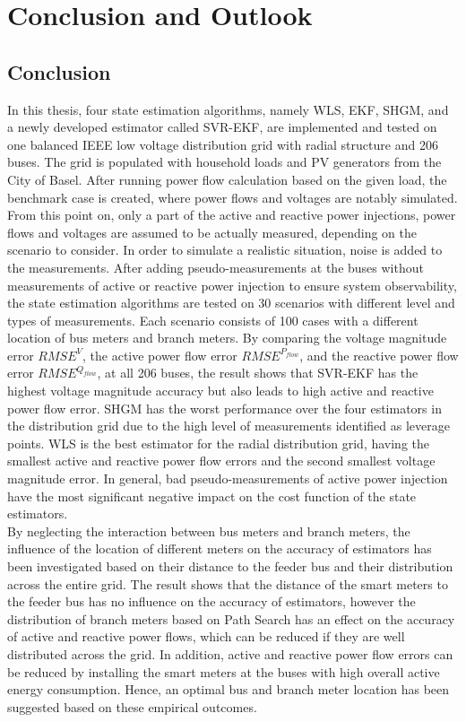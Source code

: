 \chapter{Conclusion and Outlook}

\section{Conclusion}
In this thesis, four state estimation algorithms, namely WLS, EKF, SHGM, and a newly developed estimator called SVR-EKF, are implemented and tested on one balanced IEEE low voltage distribution grid with radial structure and 206 buses. The grid is populated with household loads and PV generators from the City of Basel. After running power flow calculation based on the given load, the benchmark case is created, where power flows and voltages are notably simulated. From this point on, only a part of the active and reactive power injections, power flows and voltages are assumed to be actually measured, depending on the scenario to consider. In order to simulate a realistic situation, noise is added to the measurements. After adding pseudo-measurements at the buses without measurements of active or reactive power injection to ensure system observability, the state estimation algorithms are tested on 30 scenarios with different level and types of measurements. Each scenario consists of 100 cases with a different location of bus meters and branch meters. By comparing the voltage magnitude error $RMSE^{V}$, the active power flow error $RMSE^{P_{flow}}$, and the reactive power flow error $RMSE^{Q_{flow}}$, at all 206 buses, the result shows that SVR-EKF has the highest voltage magnitude accuracy but also leads to high active and reactive power flow error. SHGM has the worst performance over the four estimators in the distribution grid due to the high level of measurements identified as leverage points. WLS is the best estimator for the radial distribution grid, having the smallest active and reactive power flow errors and the second smallest voltage magnitude error. In general, bad pseudo-measurements of active power injection have the most significant negative impact on the cost function of the state estimators.
\bigskip
\\By neglecting the interaction between bus meters and branch meters, the influence of the location of different meters on the accuracy of estimators has been investigated based on their distance to the feeder bus and their distribution across the entire grid. The result shows that the distance of the smart meters to the feeder bus has no influence on the accuracy of estimators, however the distribution of branch meters based on Path Search has an effect on the accuracy of active and reactive power flows, which can be reduced if they are well distributed across the grid. In addition, active and reactive power flow errors can be reduced by installing the smart meters at the buses with high overall active energy consumption. Hence, an optimal bus and branch meter location has been suggested based on these empirical outcomes.
